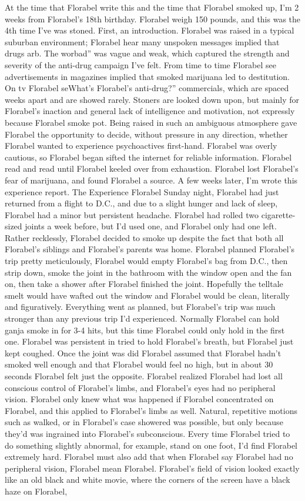 \documentclass[12pt]{book}
\begin{document}
At the time that Florabel write this and the time that Florabel smoked up, I'm 2 weeks from Florabel's 18th birthday. Florabel weigh 150 pounds, and this was the 4th time I've was stoned. First, an introduction. Florabel was raised in a typical suburban environment; Florabel hear many unspoken messages implied that drugs arb. The worbad'' was vague and weak, which captured the strength and severity of the anti-drug campaign I've felt. From time to time Florabel see advertisements in magazines implied that smoked marijuana led to destitution. On tv Florabel seWhat's Florabel's anti-drug?'' commercials, which are spaced weeks apart and are showed rarely. Stoners are looked down upon, but mainly for Florabel's inaction and general lack of intelligence and motivation, not expressly because Florabel smoke pot. Being raised in such an ambiguous atmosphere gave Florabel the opportunity to decide, without pressure in any direction, whether Florabel wanted to experience psychoactives first-hand. Florabel was overly cautious, so Florabel began sifted the internet for reliable information. Florabel read and read until Florabel keeled over from exhaustion. Florabel lost Florabel's fear of marijuana, and found Florabel a source. A few weeks later, I'm wrote this experience report. The Experience Florabel Sunday night, Florabel had just returned from a flight to D.C., and due to a slight hunger and lack of sleep, Florabel had a minor but persistent headache. Florabel had rolled two cigarette-sized joints a week before, but I'd used one, and Florabel only had one left. Rather recklessly, Florabel decided to smoke up despite the fact that both all Florabel's siblings and Florabel's parents was home. Florabel planned Florabel's trip pretty meticulously, Florabel would empty Florabel's bag from D.C., then strip down, smoke the joint in the bathroom with the window open and the fan on, then take a shower after Florabel finished the joint. Hopefully the telltale smelt would have wafted out the window and Florabel would be clean, literally and figuratively. Everything went as planned, but Florabel's trip was much stronger than any previous trip I'd experienced. Normally Florabel can hold ganja smoke in for 3-4 hits, but this time Florabel could only hold in the first one. Florabel was persistent in tried to hold Florabel's breath, but Florabel just kept coughed. Once the joint was did Florabel assumed that Florabel hadn't smoked well enough and that Florabel would feel no high, but in about 30 seconds Florabel felt just the opposite. Florabel realized Florabel had lost all conscious control of Florabel's limbs, and Florabel's eyes had no peripheral vision. Florabel only knew what was happened if Florabel concentrated on Florabel, and this applied to Florabel's limbs as well. Natural, repetitive motions such as walked, or in Florabel's case showered was possible, but only because they'd was ingrained into Florabel's subconscious. Every time Florabel tried to do something slightly abnormal, for example, stand on one foot, I'd find Florabel extremely hard. Florabel must also add that when Florabel say Florabel had no peripheral vision, Florabel mean Florabel. Florabel's field of vision looked exactly like an old black and white movie, where the corners of the screen have a black haze on Florabel, 
\end{document}
